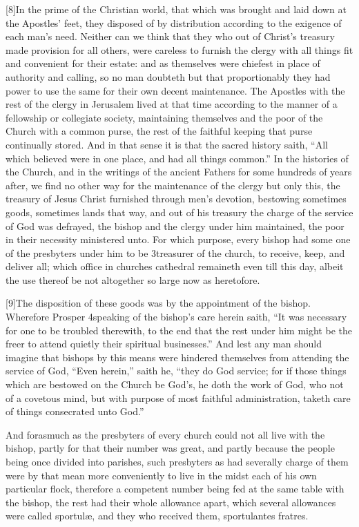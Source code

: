 [8]In the prime of the Christian world, that which was  brought and laid down at the Apostles’ feet, they disposed of by distribution according to the exigence of each man’s need. Neither can we think that they who out of Christ’s treasury made provision for all others, were careless to furnish the clergy with all things fit and convenient for their estate: and as themselves were chiefest in place of authority and calling, so no man doubteth but that proportionably they had power to use the same for their own decent maintenance. The Apostles with the rest of the clergy in Jerusalem lived at that time according to the manner of a fellowship or collegiate society, maintaining themselves and the poor of the Church with a common purse, the rest of the faithful keeping that purse continually stored. And in that sense it is that the sacred history saith, “All which believed were in one place, and had all things common.” In the histories of the Church, and in the writings of the ancient Fathers for some hundreds of years after, we find no other way for the maintenance of the clergy but only this, the treasury of Jesus Christ furnished through men’s devotion, bestowing sometimes goods, sometimes lands that way, and out of his treasury the charge of the service of God was defrayed, the bishop and the clergy under him maintained, the poor in their necessity ministered unto. For which purpose, every bishop had some one of the presbyters under him to be 3treasurer of the church, to receive, keep, and deliver all; which office in churches cathedral remaineth even till this day, albeit the use thereof be not altogether so large now as heretofore.

[9]The disposition of these goods was by the appointment of the bishop. Wherefore Prosper 4speaking of the bishop’s care herein saith, “It was necessary for one to be troubled therewith, to the end that the rest under him  might be the freer to attend quietly their spiritual businesses.” And lest any man should imagine that bishops by this means were hindered themselves from attending the service of God, “Even herein,” saith he, “they do God service; for if those things which are bestowed on the Church be God’s, he doth the work of God, who not of a covetous mind, but with purpose of most faithful administration, taketh care of things consecrated unto God.”

And forasmuch as the presbyters of every church could not all live with the bishop, partly for that their number was great, and partly because the people being once divided into parishes, such presbyters as had severally charge of them were by that mean more conveniently to live in the midst each of his own particular flock, therefore a competent number being fed at the same table with the bishop, the rest had their whole allowance apart, which several allowances were called sportulæ, and they who received them, sportulantes fratres.

